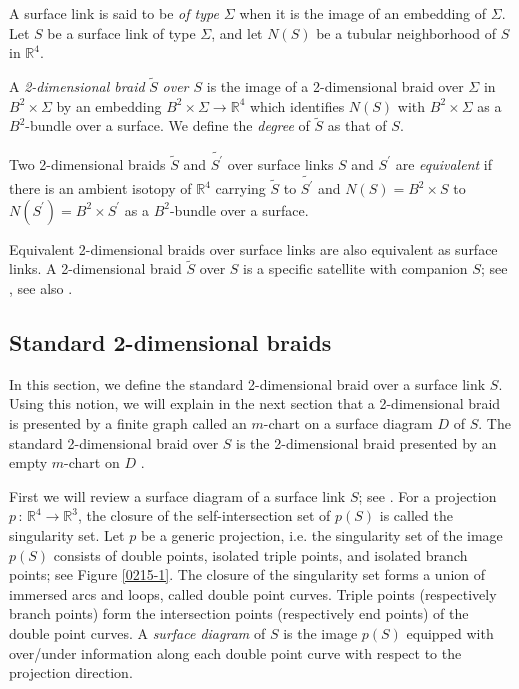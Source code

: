 \documentclass[a4paper,11pt]{amsart}
\numberwithin{equation}{section}
\begin{document}
A surface link is said to be {\it of type $\Sigma$} when it is the image of an embedding of $\Sigma$. 
Let $S$ be a surface link of type $\Sigma$, and let $N(S)$ be a tubular neighborhood of $S$ in $\mathbb{R}^4$. 

\begin{definition}\label{def:2-braid}
A {\it 2-dimensional braid} $\widetilde{S}$ {\it over $S$} is the image of a 2-dimensional braid over $\Sigma$ in $B^2 \times \Sigma$ by an embedding $B^2 \times \Sigma \to \mathbb{R}^4$ which identifies $N(S)$ with $B^2 \times \Sigma$ as a $B^2$-bundle over a surface.
We define the {\it degree} of $\widetilde{S}$ as that of $S$.

Two 2-dimensional braids $\widetilde{S}$ and $\widetilde{S^\prime}$ over surface links $S$ and $S^\prime$ are {\it equivalent} if there is an ambient isotopy of $\mathbb{R}^4$ carrying $\widetilde{S}$ to $\widetilde{S^\prime}$ and $N(S)=B^2 \times S$ to $N(S^\prime)=B^2 \times S^\prime$ as a $B^2$-bundle over a surface. 

\end{definition}
 
Equivalent 2-dimensional braids over surface links are also equivalent as surface links. 
A 2-dimensional braid $\widetilde{S}$ over $S$ is a specific satellite with companion $S$; see \cite[Section 2.4.2]{CKS}, see also \cite[Chapter 1]{Lickorish}.  


\subsection{Standard 2-dimensional braids}\label{sec:2-2}
In this section, we define the standard 2-dimensional braid over a surface link $S$. Using this notion, we will explain in the next section that a 2-dimensional braid is presented by a finite graph called an $m$-chart on a surface diagram $D$ of $S$. The standard 2-dimensional braid over $S$ is the 2-dimensional braid presented by an empty $m$-chart on $D$ \cite{N4}.

First we will review a surface diagram of a surface link $S$; see \cite{CKS}. For a projection $p \,:\, \mathbb{R}^4 \to \mathbb{R}^3$, the closure of the self-intersection set of $p(S)$ is called the singularity set. Let $p$ be a generic projection, i.e. the singularity set of the image $p(S)$ consists of double points, isolated triple points, and isolated branch points; see Figure \ref{0215-1}. The closure of the singularity set forms a union of immersed arcs and loops, called double point curves. Triple points (respectively branch points) form the intersection points (respectively end points) of the double point curves. A {\it surface diagram} of $S$ is the image $p(S)$ equipped with over/under information along each double point curve with respect to the projection direction. 
 
\end{document}
